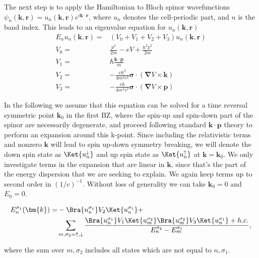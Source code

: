 The next step is to apply the Hamiltonian to Bloch spinor wavefunctions $\psi_n(\bm{k}, \bm{r}) = u_n(\bm{k}, \bm{r})e^{i\bm{k}\cdot\bm{r}}$, where $u_n$ denotes the cell-periodic part, and $n$ is the band index. This leads to an eigenvalue equation for $u_n(\bm{k}, \bm{r})$
\begin{align}
	E_n u_n(\bm{k}, \bm{r}) =& \left(V_0 + V_1  +  V_2 + V_3 \right) u_n(\bm{k}, \bm{r}) \\
	V_0 =& \frac{p^2}{2m} - eV + \frac{\hbar^2 k^2}{2m} \\
	V_1 =& \hbar\frac{\bm{k}\cdot\bm{p}}{m} \\
	V_2 =& -\frac{e \hbar^2}{4m^2c^2} \bm{\sigma} \cdot ( \bm{\nabla}V \times \bm{k}) \\
	V_3 =& -\frac{e \hbar}{4m^2c^2} \bm{\sigma} \cdot ( \bm{\nabla}V \times \bm{p})
\end{align}

In the following we assume that this equation can be solved for a time reversal symmetric point $\bm{k}_0$ in the first BZ, where the spin-up and spin-down part of the spinor are necessarily degenerate, and proceed following standard $\bm{k}\cdot\bm{p}$ theory to perform an expansion around this k-point. Since including the relativistic terms and nonzero $\bm{k}$ will lead to spin up-down symmetry breaking, we will denote the down spin state as $\Ket{u_n^\downarrow}$ and up spin state as $\Ket{u_n^\uparrow}$ at $\bm{k} = \bm{k}_0$. We only investigate terms in the expansion that are linear in $\bm{k}$, since that's the part of the energy dispersion that we are seeking to explain. We again keep terms up to second order in $(1/c)^{-1}$.
Without loss of generality we can take $\bm{k}_0 = 0$ and $E_0 = 0$.

\begin{align}
	\label{eq:kp_expansion}
	E_n^{\sigma_1}(\bm{k}) =& - \Bra{u_n^{\sigma_1}} V_2 \Ket{u_n^{\sigma_1}} + \\
		& \sum_{m,\sigma_2=\uparrow,\downarrow}\frac{\Bra{u_n^{\sigma_1}} V_1 \Ket{u_m^{\sigma_2}}\Bra{u_m^{\sigma_2}} V_3 \Ket{u_n^{\sigma_1}} + h.c.}{E_n^{\sigma_2} - E_m^{\sigma_1}},
\end{align}

where the sum over $m, \sigma_2$ includes all states which are not equal to $n, \sigma_1$. 

